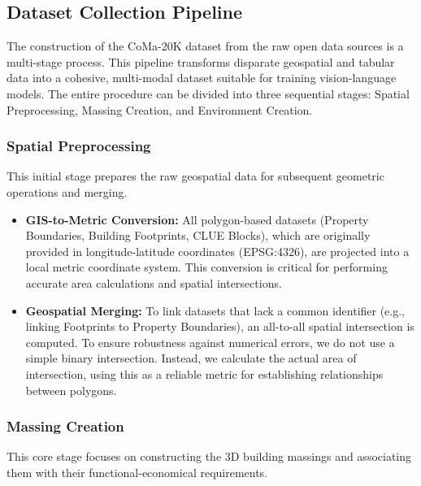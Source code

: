 \subsection{Dataset Collection Pipeline}

The construction of the CoMa-20K dataset from the raw open data sources is a multi-stage process. This pipeline transforms disparate geospatial and tabular data into a cohesive, multi-modal dataset suitable for training vision-language models. The entire procedure can be divided into three sequential stages: Spatial Preprocessing, Massing Creation, and Environment Creation.

\subsubsection*{Spatial Preprocessing}
This initial stage prepares the raw geospatial data for subsequent geometric operations and merging.

\begin{itemize}
    \item \textbf{GIS-to-Metric Conversion:} All polygon-based datasets (Property Boundaries, Building Footprints, CLUE Blocks), which are originally provided in longitude-latitude coordinates (EPSG:4326), are projected into a local metric coordinate system. This conversion is critical for performing accurate area calculations and spatial intersections.
    \item \textbf{Geospatial Merging:} To link datasets that lack a common identifier (e.g., linking Footprints to Property Boundaries), an all-to-all spatial intersection is computed. To ensure robustness against numerical errors, we do not use a simple binary intersection. Instead, we calculate the actual area of intersection, using this as a reliable metric for establishing relationships between polygons.
\end{itemize}

\subsubsection*{Massing Creation}
This core stage focuses on constructing the 3D building massings and associating them with their functional-economical requirements.

